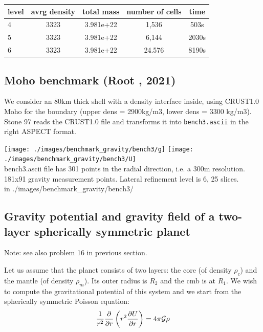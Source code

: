 \begin{tabular}{lcccc}
\hline
level & avrg density & total mass & number of cells & time \\
\hline
\hline
4     & 3323  & 3.981e+22 & 1,536  & 503s  \\
5     & 3323  & 3.981e+22 & 6,144  & 2030s \\
6     & 3323  & 3.981e+22 & 24.576 & 8190s \\
\hline
\end{tabular}

\newpage
\subsection{Moho benchmark (Root \etal, 2021)}

We consider an 80km thick shell with a density interface inside, using CRUST1.0 Moho 
for the boundary (upper dens = 2900kg/m3, lower dens = 3300 kg/m3).
Stone 97 reads the CRUST1.0 file and transforms it into {\tt bench3.ascii} in the 
right ASPECT format.  


\begin{center}
\texttt{[image: ./images/benchmark\_gravity/bench3/g]}
\texttt{[image: ./images/benchmark\_gravity/bench3/U]}\\
{\captionfont bench3.ascii file has 301 points in the radial direction, i.e. a 
300m resolution. 181x91 gravity measurement points. Lateral refinement level is 6, 25 slices.\\
{\tiny {\color{gray} in ./images/benchmark\_gravity/bench3/}}
}
\end{center}


\newpage
\subsection{Gravity potential and gravity field of a two-layer 
spherically symmetric planet}

Note: see also problem 16 in previous section.

Let us assume that the planet consists of two layers: 
the core (of density $\rho_c$) and the mantle (of density $\rho_m$).
Its outer radius is $R_2$ and the cmb is at $R_1$.
We wish to compute the gravitational potential of this system
and we start from the spherically symmetric Poisson equation:
\begin{equation}
\frac{1}{r^2} \frac{\partial}{\partial r}\left( r^2 \frac{\partial U}{\partial r} \right)
=
4 \pi {\cal G} \rho
\label{poissonpde}
\end{equation}

